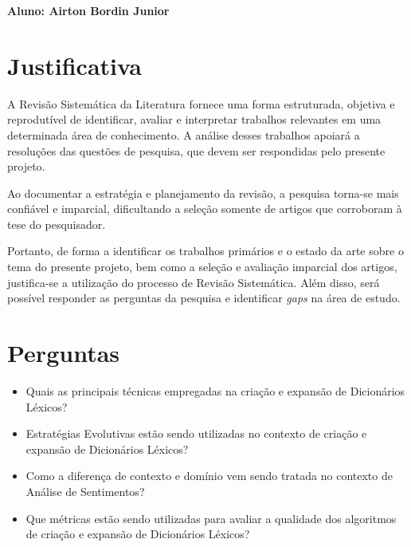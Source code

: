 \documentclass[a4paper,11pt]{article}
\begin{document}
\selectfont



\begin{framed}
\begin{center}
\textbf{Aluno: Airton Bordin Junior}
\end{center}


\end{framed}

\section{Justificativa}
A Revisão Sistemática da Literatura fornece uma forma estruturada, objetiva e reprodutível de identificar, avaliar e interpretar trabalhos relevantes em uma determinada área de conhecimento. A análise desses trabalhos apoiará a resoluções das questões de pesquisa, que devem ser respondidas pelo presente projeto.

Ao documentar a estratégia e planejamento da revisão, a pesquisa torna-se mais confiável e imparcial, dificultando a seleção somente de artigos que corroboram à tese do pesquisador. 

Portanto, de forma a identificar os trabalhos primários e o estado da arte sobre o tema do presente projeto, bem como a seleção e avaliação imparcial dos artigos, justifica-se a utilização do processo de Revisão Sistemática. Além disso, será possível responder as perguntas da pesquisa e identificar \emph{gaps} na área de estudo.

\section{Perguntas}
\begin{itemize}
	\item{Quais as principais técnicas empregadas na criação e expansão de Dicionários Léxicos?}
	\item{Estratégias Evolutivas estão sendo utilizadas no contexto de criação e expansão de Dicionários Léxicos?}
	\item{Como a diferença de contexto e domínio vem sendo tratada no contexto de Análise de Sentimentos?}
	\item{Que métricas estão sendo utilizadas para avaliar a qualidade dos algoritmos de criação e expansão de Dicionários Léxicos?}
\end{itemize}
\end{document}
